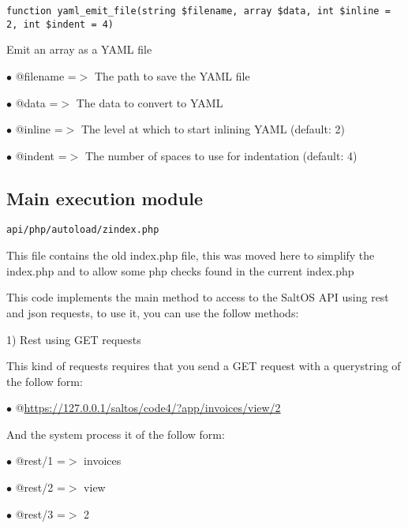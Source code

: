 \documentclass[a4paper]{article}
\def\htmladdnormallink#1#2{\href{#2}{#1}}
\begin{document}
\begin{lstlisting}
function yaml_emit_file(string $filename, array $data, int $inline = 2, int $indent = 4)
\end{lstlisting}

Emit an array as a YAML file

\begin{compactitem}
\item[\color{myblue}$\bullet$] @filename =$>$ The path to save the YAML file
\item[\color{myblue}$\bullet$] @data     =$>$ The data to convert to YAML
\item[\color{myblue}$\bullet$] @inline   =$>$ The level at which to start inlining YAML (default: 2)
\item[\color{myblue}$\bullet$] @indent   =$>$ The number of spaces to use for indentation (default: 4)
\end{compactitem}

\hypertarget{toc289}{}
\subsection{Main execution module}

\begin{lstlisting}
api/php/autoload/zindex.php
\end{lstlisting}

This file contains the old index.php file, this was moved here to simplify the index.php and to
allow some php checks found in the current index.php

This code implements the main method to access to the SaltOS API using rest and json requests, to
use it, you can use the follow methods:

1) Rest using GET requests

This kind of requests requires that you send a GET request with a querystring of the follow
form:

\begin{compactitem}
\item[\color{myblue}$\bullet$] @\htmladdnormallink{https://127.0.0.1/saltos/code4/?app/invoices/view/2}{https://127.0.0.1/saltos/code4/?app/invoices/view/2}
\end{compactitem}

And the system process it of the follow form:

\begin{compactitem}
\item[\color{myblue}$\bullet$] @rest/1 =$>$ invoices
\item[\color{myblue}$\bullet$] @rest/2 =$>$ view
\item[\color{myblue}$\bullet$] @rest/3 =$>$ 2
\end{compactitem}
\end{document}
